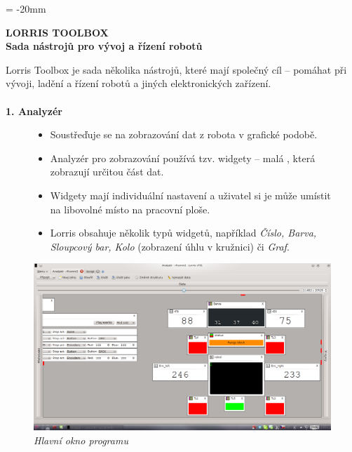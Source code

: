 \documentclass[17pt]{extreport}
\newcommand{\B}{\textbf} %
\newcommand{\It}{\textit}  %
\begin{document}

\pagestyle{empty} %

\voffset = -20mm %
\enlargethispage{100mm} %

\begin{center}
    \Large \B{LORRIS TOOLBOX \\ Sada nástrojů pro vývoj a řízení robotů}
\end{center}
\vspace{5mm}
\setlength{\footskip}{0pt}
\setlength{\textheight}{750pt}
Lorris Toolbox je sada několika nástrojů, které mají společný cíl -- pomáhat při vývoji, ladění a řízení robotů a jiných elektronických zařízení.\\ \\
{\large \B{ 1. Analyzér }}
\begin{figure}[ht]
    \begin{minipage}[t]{0.48\linewidth}
    \begin{itemize} 
        \item Soustřeďuje se na zobrazování dat z robota v grafické podobě.
        \item Analyzér pro zobrazování používá tzv. widgety -- malá , která zobrazují určitou část dat.
        \item Widgety mají individuální nastavení a uživatel si je může umístit na libovolné místo na pracovní ploše.
        \item Lorris obsahuje několik typů widgetů, například \It{Číslo, Barva, Sloupcový bar, Kolo} (zobrazení úhlu v kružnici) či \It{Graf}.
    \end{itemize}
    \end{minipage}
    \hfill
    \begin{minipage}[t]{0.50\linewidth}
        \vspace{0pt}
        \includegraphics[width=\linewidth]{img/screen.png}
        \centering \It{Hlavní okno programu}
    \end{minipage}
\end{figure}
\end{document}
